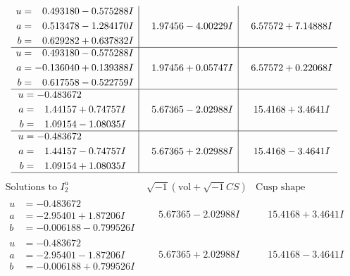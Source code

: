 \documentclass[1p]{elsarticle_modified}
\theoremstyle{definition}
\newcommand{\I}{\sqrt{-1}}
\begin{document}
$$\begin{array}{c|c|c}
\begin{aligned}
u &= \phantom{-}0.493180 - 0.575288 I \\
a &= \phantom{-}0.513478 - 1.284170 I \\
b &= \phantom{-}0.629282 + 0.637832 I\end{aligned}
 & \phantom{-}1.97456 - 4.00229 I & \phantom{-}6.57572 + 7.14888 I \\ \hline\begin{aligned}
u &= \phantom{-}0.493180 - 0.575288 I \\
a &= -0.136040 + 0.139388 I \\
b &= \phantom{-}0.617558 - 0.522759 I\end{aligned}
 & \phantom{-}1.97456 + 0.05747 I & \phantom{-}6.57572 + 0.22068 I \\ \hline\begin{aligned}
u &= -0.483672\phantom{ +0.000000I} \\
a &= \phantom{-}1.44157 + 0.74757 I \\
b &= \phantom{-}1.09154 - 1.08035 I\end{aligned}
 & \phantom{-}5.67365 - 2.02988 I & \phantom{-}15.4168 + 3.4641 I \\ \hline\begin{aligned}
u &= -0.483672\phantom{ +0.000000I} \\
a &= \phantom{-}1.44157 - 0.74757 I \\
b &= \phantom{-}1.09154 + 1.08035 I\end{aligned}
 & \phantom{-}5.67365 + 2.02988 I & \phantom{-}15.4168 - 3.4641 I\\
 \hline 
 \end{array}$$\newpage$$\begin{array}{c|c|c}  
\text{Solutions to }I^u_{2}& \I (\text{vol} + \sqrt{-1}CS) & \text{Cusp shape}\\
 \hline 
\begin{aligned}
u &= -0.483672\phantom{ +0.000000I} \\
a &= -2.95401 + 1.87206 I \\
b &= -0.006188 - 0.799526 I\end{aligned}
 & \phantom{-}5.67365 - 2.02988 I & \phantom{-}15.4168 + 3.4641 I \\ \hline\begin{aligned}
u &= -0.483672\phantom{ +0.000000I} \\
a &= -2.95401 - 1.87206 I \\
b &= -0.006188 + 0.799526 I\end{aligned}
 & \phantom{-}5.67365 + 2.02988 I & \phantom{-}15.4168 - 3.4641 I \\ \hline\begin{aligned}

\end{aligned}
\end{array}$$
\end{document}

